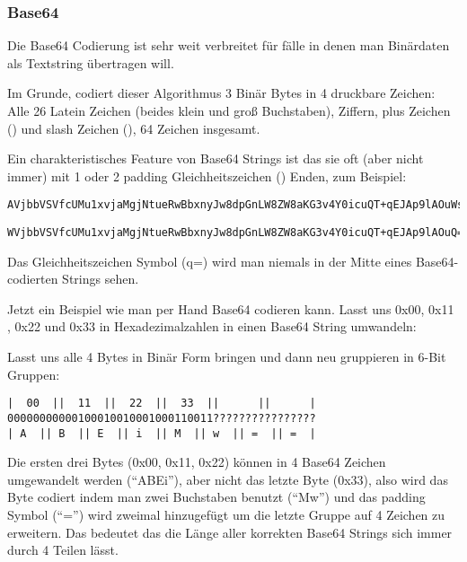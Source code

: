 \subsubsection{Base64}

Die Base64 Codierung ist sehr weit verbreitet f\"ur f\"alle in denen man Bin\"ardaten als Textstring \"ubertragen will.

Im Grunde, codiert dieser Algorithmus 3 Bin\"ar Bytes in 4 druckbare Zeichen: 
Alle 26 Latein Zeichen (beides klein und groß Buchstaben), Ziffern, plus Zeichen (\q{+}) und slash Zeichen (\q{/}),
64 Zeichen insgesamt. 

Ein charakteristisches Feature von Base64 Strings ist das sie oft (aber nicht immer) mit 1 oder 2  \gls{padding}
Gleichheitszeichen (\q{=}) Enden, zum Beispiel: 

\begin{lstlisting}
AVjbbVSVfcUMu1xvjaMgjNtueRwBbxnyJw8dpGnLW8ZW8aKG3v4Y0icuQT+qEJAp9lAOuWs=
\end{lstlisting}

\begin{lstlisting}
WVjbbVSVfcUMu1xvjaMgjNtueRwBbxnyJw8dpGnLW8ZW8aKG3v4Y0icuQT+qEJAp9lAOuQ==
\end{lstlisting}

Das Gleichheitszeichen Symbol (q{=}) wird man niemals in der Mitte eines Base64-codierten
Strings sehen.

Jetzt ein Beispiel wie man per Hand Base64 codieren kann.
Lasst uns 0x00, 0x11 , 0x22 und 0x33 in Hexadezimalzahlen in einen Base64
String umwandeln: 



Lasst uns alle 4 Bytes in Bin\"ar Form bringen und dann neu gruppieren in 6-Bit Gruppen:

\begin{lstlisting}
|  00  ||  11  ||  22  ||  33  ||      ||      |
00000000000100010010001000110011????????????????
| A  || B  || E  || i  || M  || w  || =  || =  |
\end{lstlisting}

Die ersten drei Bytes (0x00, 0x11, 0x22) k\"onnen in 4 Base64 Zeichen umgewandelt werden (``ABEi''),
aber nicht das letzte Byte (0x33), also wird das Byte codiert indem man zwei Buchstaben 
benutzt (``Mw'') und das \gls{padding} Symbol (``='') wird zweimal hinzugef\"ugt um die letzte
Gruppe auf 4 Zeichen zu erweitern. Das bedeutet das die L\"ange aller korrekten Base64 Strings
sich immer durch 4 Teilen l\"asst. 

